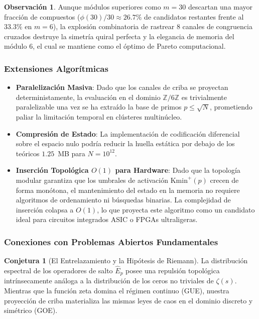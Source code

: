 \documentclass{article}
\numberwithin{equation}{section}
\theoremstyle{plain}
\theoremstyle{definition}
\newtheorem{remark}[theorem]{Observación}
\newtheorem{conjecture}[theorem]{Conjetura}
\begin{document}
\begin{remark}
Aunque módulos superiores como $m=30$ descartan una mayor fracción de compuestos ($\phi(30)/30 \approx 26.7\%$ de candidatos restantes frente al $33.3\%$ en $m=6$), la explosión combinatoria de rastrear $8$ canales de congruencia cruzados destruye la simetría quiral perfecta y la elegancia de memoria del módulo 6, el cual se mantiene como el óptimo de Pareto computacional.
\end{remark}

\subsubsection{Extensiones Algorítmicas}

\begin{itemize}
    \item \textbf{Paralelización Masiva}: Dado que los canales de criba se proyectan deterministamente, la evaluación en el dominio $\mathbb{Z}/6\mathbb{Z}$ es trivialmente paralelizable una vez se ha extraído la base de primos $p \le \sqrt{N}$, prometiendo paliar la limitación temporal en clústeres multinúcleo.
    \item \textbf{Compresión de Estado}: La implementación de codificación diferencial sobre el espacio nulo podría reducir la huella estática por debajo de los teóricos $1.25$~MB para $N=10^{12}$.
    \item \textbf{Inserción Topológica $O(1)$ para Hardware}: Dado que la topología modular garantiza que los umbrales de activación $\mathrm{Kmin}^+(p)$ crecen de forma monótona, el mantenimiento del estado en la memoria no requiere algoritmos de ordenamiento ni búsquedas binarias. La complejidad de inserción colapsa a $O(1)$, lo que proyecta este algoritmo como un candidato ideal para circuitos integrados ASIC o FPGAs ultraligeras.
\end{itemize}

\subsubsection{Conexiones con Problemas Abiertos Fundamentales}

\begin{conjecture}[El Entrelazamiento y la Hipótesis de Riemann]
La distribución espectral de los operadores de salto $\hat{E}_p$ posee una repulsión topológica intrínsecamente análoga a la distribución de los ceros no triviales de $\zeta(s)$. Mientras que la función zeta domina el régimen continuo (GUE), nuestra proyección de criba materializa las mismas leyes de caos en el dominio discreto y simétrico (GOE).
\end{conjecture}
\end{document}
